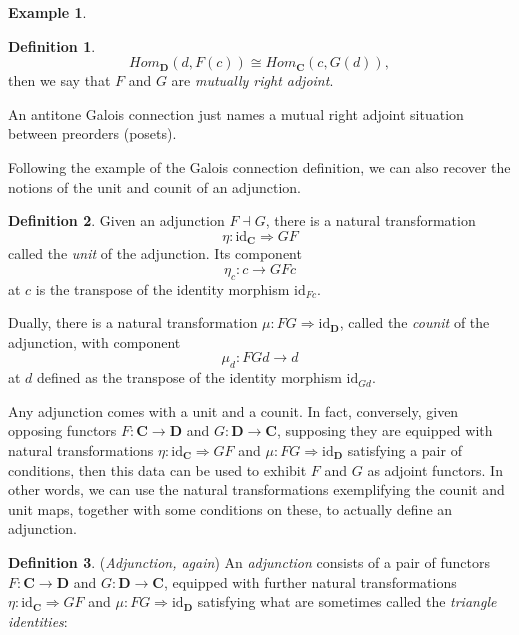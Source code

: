 \documentclass[a4paper]{book}
\theoremstyle{definition}
\newtheorem{example}{Example}[section]
\theoremstyle{definition}
\newtheorem{definition}{Definition}[section]
\theoremstyle{definition}
\theoremstyle{theorem}
\theoremstyle{definition}
\begin{document}
\begin{example}
\begin{definition}
\begin{equation}
	Hom_{\textbf{D}}(d, F(c)) \cong Hom_{\textbf{C}}(c, G(d)),
	\end{equation}
	then we say that $F$ and $G$ are \textit{mutually right adjoint}.
\end{definition} \noindent 
An antitone Galois connection just names a mutual right adjoint situation between preorders (posets). \par 
	Following the example of the Galois connection definition, we can also recover the notions of the unit and counit of an adjunction.
	\begin{definition}
		Given an adjunction $F \dashv G$, there is a natural transformation 
		\begin{equation*}
		\eta: \text{id}_{\textbf{C}} \Rightarrow GF
		\end{equation*} 
		called the \textit{unit} of the adjunction. Its component 
		\begin{equation*}
		\eta_c: c \rightarrow GFc
		\end{equation*}
		at $c$ is the transpose of the identity morphism $\text{id}_{Fc}$. \par 
		Dually, there is a natural transformation $\mu: FG \Rightarrow \text{id}_{\textbf{D}}$, called the \textit{counit} of the adjunction,  with component 
		\begin{equation*}
		\mu_d: FGd \rightarrow d
		\end{equation*}
		at $d$ defined as the transpose of the identity morphism $\text{id}_{Gd}$. 
	\end{definition}
Any adjunction comes with a unit and a counit. In fact, conversely, given opposing functors $F: \textbf{C} \rightarrow \textbf{D}$ and $G: \textbf{D} \rightarrow \textbf{C}$, supposing they are equipped with natural transformations $\eta: \text{id}_{\textbf{C}} \Rightarrow GF$ and $\mu: FG \Rightarrow \text{id}_{\textbf{D}}$ satisfying a pair of conditions, then this data can be used to exhibit $F$ and $G$ as adjoint functors. In other words, we can use the natural transformations exemplifying the counit and unit maps, together with some conditions on these, to actually define an adjunction. 
\begin{definition}
	(\textit{Adjunction, again})  An \textit{adjunction} consists of a pair of functors $F: \textbf{C} \rightarrow \textbf{D}$ and $G: \textbf{D} \rightarrow \textbf{C}$, equipped with further natural transformations $\eta: \text{id}_{\textbf{C}} \Rightarrow GF$ and $\mu: FG \Rightarrow \text{id}_{\textbf{D}}$ satisfying what are sometimes called the \textit{triangle identities}:

\end{definition}
\end{example}
\end{document}
